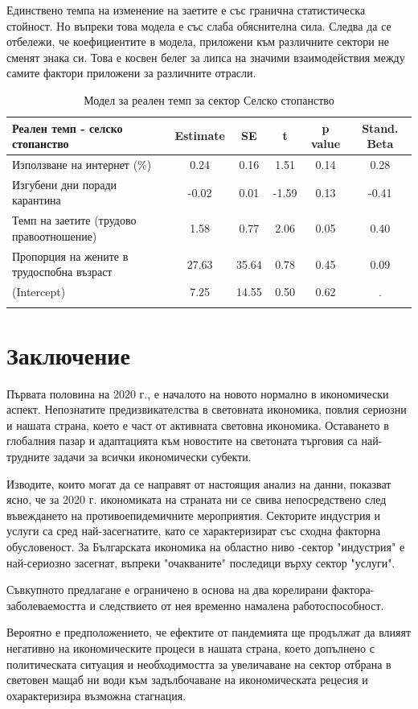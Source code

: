 \documentclass[a4paper,12pt]{article}
\begin{document}
Единствено темпа на изменение на заетите е със гранична статистическа стойност. Но въпреки това модела е със слаба обяснителна сила. Следва да се отбележи, че коефициентите в модела, приложени към различните сектори не сменят знака си. Това е косвен белег за липса на значими взаимодействия между самите фактори приложени за различните отрасли. 
\begin{table}[ht]
	\centering
	\caption{Модел за реален темп за сектор Селско стопанство}
	\begin{tabular}{rccccc}
		\toprule
		\multicolumn{1}{l}{Реален темп - селско стопанство} & Estimate & SE    & t     & p value & Stand. Beta \\
		\midrule
		\multicolumn{1}{l}{Използване на интернет (\%)} & 0.24  & 0.16  & 1.51  & 0.14  & 0.28 \\
		\multicolumn{1}{l}{Изгубени дни поради карантина } & -0.02 & 0.01  & -1.59 & 0.13  & -0.41 \\
		\multicolumn{1}{l}{Темп на заетите (трудово правоотношение)} & 1.58  & 0.77  & 2.06  & 0.05  & 0.40 \\
		\multicolumn{1}{l}{Пропорция на жените в трудоспобна възраст } & 27.63 & 35.64 & 0.78  & 0.45  & 0.09 \\
		\multicolumn{1}{l}{(Intercept)} & 7.25  & 14.55 & 0.50  & 0.62  & . \\
		\midrule
		&       &       &       &       &  \\
	\end{tabular}%
	\label{tab:addlabel}%
\end{table}%


\section{Заключение}
Първата половина на 2020 г., е началото на новото нормално в икономически аспект. Непознатите предизвикателства в световната икономика, повлия сериозни и нашата страна, което е част от активната световна икономика. Оставането в глобалния пазар и адаптацията към новостите на светоната търговия са най-трудните задачи за всички икономически субекти.

Изводите, които могат да се направят от настоящия анализ на данни, показват ясно, че за 2020 г. икономиката на страната ни се свива непосредствено след въвеждането на противоепидемичните мероприятия. Секторите индустрия и услуги са сред най-засегнатите, като се характеризират със сходна факторна обусловеност. За Българската икономика на областно ниво -сектор "индустрия" е най-сериозно засегнат, въпреки "очакваните" последици върху сектор "услуги".

Съвкупното предлагане е ограничено в основа на два корелирани фактора- заболеваемостта и следствието от нея временно намалена работоспособност.

Вероятно е предположението, че ефектите от пандемията ще продължат да влияят негативно на икономическите процеси в нашата страна, което допълнено с политическата ситуация и необходимостта за увеличаване на сектор отбрана в световен мащаб ни води към задълбочаване на икономическата рецесия и охарактеризира възможна стагнация.





\end{document}
